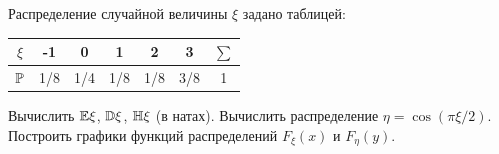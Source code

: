 
\renewcommand*{\proofname}{Решение}

\begin{problem}
Распределение случайной величины $\xi $ задано таблицей:
\begin{center}
\begin{table}[h!]
    \centering
    \begin{tabular}{|c|c|c|c|c|c|c|}
        \hline
        $\xi$ & -1 & 0 & 1 & 2 & 3 & $\sum$ \\
        \hline
        $\mathbb P$ & 1/8 & 1/4 & 1/8 & 1/8 & 3/8 & 1 \\
        \hline
    \end{tabular}
\end{table}
\end{center}
Вычислить $\mathbb E\xi $, $\mathbb D\xi $, $\mathbb H\xi $ (в натах). Вычислить распределение $ \eta = \cos(\pi\xi/2)$. Построить графики функций распределений $ F_{\xi}(x)$ и $ F_{\eta}(y)$.
\end{problem}

